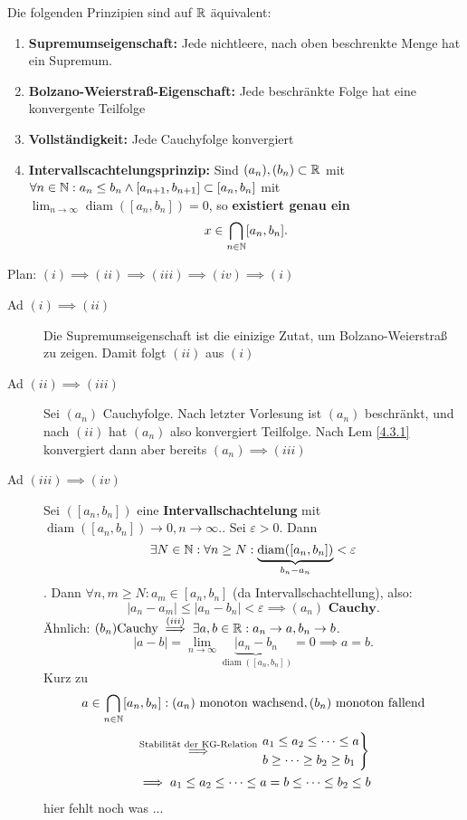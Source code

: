\documentclass[consecutivenumbering]{gadsescript}
\begin{document}
\begin{subtheorem}
	Die folgenden Prinzipien sind auf $ \mathbb{R} $ äquivalent:
	\begin{enumerate}[label=(\roman*)]
		\item \textbf{Supremumseigenschaft:} Jede nichtleere, nach oben beschrenkte Menge hat ein Supremum.
		\item \textbf{Bolzano-Weierstraß-Eigenschaft:} Jede beschränkte Folge hat eine konvergente Teilfolge
		\item \textbf{Vollständigkeit:} Jede Cauchyfolge konvergiert
		\item \textbf{Intervallscachtelungsprinzip:} Sind $ (a_n), (b_n) \subset \mathbb{R} $ mit $ \forall n \in \mathbb{N} : a_n \leq b_n \wedge [a_{n+1}, b_{n+1}] \subset [a_n, b_n] $ mit
			$\lim_{n\to\infty} \operatorname{diam}([a_n, b_n]) = 0 $, so \textbf{existiert genau ein}
			\[ x \in \bigcap_{n\in\mathbb{N}}[a_n, b_n]. \]
	\end{enumerate}
	\begin{subproof*}
		Plan: $ (i) \implies (ii) \implies (iii) \implies (iv) \implies (i) $
		\begin{description}
			\item[Ad $ (i) \implies (ii) $] Die Supremumseigenschaft ist die einizige Zutat, um Bolzano-Weierstraß zu zeigen. Damit folgt $(ii)$ aus $(i)$
			\item[Ad $ (ii) \implies (iii) $] Sei $ (a_n) $ Cauchyfolge. Nach letzter Vorlesung ist $ ( a_n ) $ beschränkt, und nach $ (ii) $ hat $ (a_n ) $ also konvergiert Teilfolge. Nach Lem \ref{4.3.1} konvergiert dann aber bereits $ (a_n) \implies (iii) $
			\item[Ad $ (iii) \implies (iv)$] Sei $ ([a_n, b_n]) $ eine \textbf{Intervallschachtelung} mit $ \operatorname{diam}([a_n, b_n]) \to 0, n \to \infty. $. Sei $ \varepsilon > 0 $.
				Dann \[ \exists N \in \mathbb{N} : \forall n \geq N : \underbrace{\operatorname{diam}([a_n, b_n])}_{b_n - a_n} < \varepsilon \].
				Dann $ \forall n, m \geq N : a_m \in [a_n, b_n] $ (da Intervallschachtellung), also:
				\[ | a_n - a_m | \leq | a_n - b_n| < \varepsilon \implies (a_n) \textbf{ Cauchy}.\]
				Ähnlich: $ (b_n) \text{Cauchy} \overset{(iii)}{\implies} \exists a, b \in \mathbb{R}: a_n \to a, b_n \to b $.
				\[ | a- b| = \lim_{n\to\infty} \underbrace{|a_n -b_n}_{\operatorname{diam}([a_n, b_n])} = 0 \implies a = b. \]
				Kurz zu
				\[ a \in \bigcap_{n\in\mathbb{N}}[a_n, b_n] : (a_n) \text{ monoton wachsend}, (b_n) \text{ monoton fallend} \]
				\begin{align*}
					&\overset{\text{Stabilität der KG-Relation}}{\implies}
					\begin{drcases}
						a_1 \leq a_2 \leq \dotsb \leq a\\
						b  \geq \dotsb \geq b_2 \geq b_1
					\end{drcases}\\
					&\implies a_1 \leq a_2 \leq \dotsb \leq a = b \leq \dotsb \leq b_2 \leq b
				\end{align*}
				hier fehlt noch was ...
		\end{description}
	\end{subproof*}
\end{subtheorem}
\end{document}
